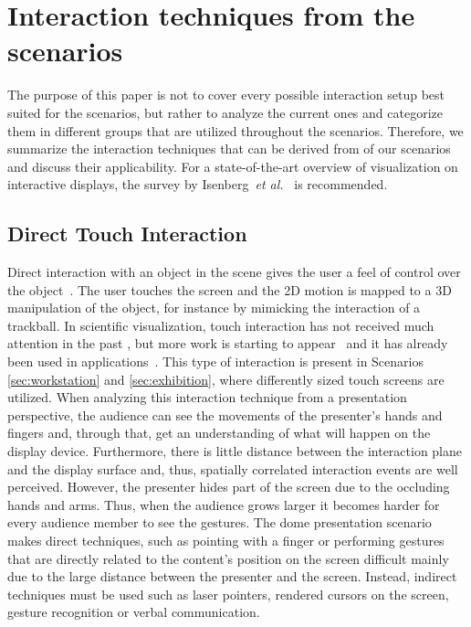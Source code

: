\documentclass[journal]{vgtc}                %
\begin{document}
\section{Interaction techniques from the scenarios} \label{sec:techniques}
The purpose of this paper is not to cover every possible interaction setup best suited for the scenarios, but rather to analyze the current ones and categorize them in different groups that are utilized throughout the scenarios.
Therefore, we summarize the interaction techniques that can be derived from of our scenarios and discuss their applicability. For a state-of-the-art overview of visualization on interactive displays, the survey by Isenberg~\textit{et al.}~\cite{isenberg:hal-00853925} is recommended.

\subsection{Direct Touch Interaction}
Direct interaction with an object in the scene gives the user a feel of control over the object~\cite{isenberg2009studying}. 
The user touches the screen and the 2D motion is mapped to a 3D manipulation of the object, for instance by mimicking the interaction of a trackball.
In scientific visualization, touch interaction has not received much attention in the past \cite{isenberg:hal-00781512}, but more work is starting to appear~\cite{Klein:2012:DSD:2322389.2322403} and it has already been used in applications~\cite{LRFPY11}.
This type of interaction is present in Scenarios \ref{sec:workstation} and \ref{sec:exhibition}, where differently sized touch screens are utilized. 
When analyzing this interaction technique from a presentation perspective, the audience can see the movements of the presenter's hands and fingers and, through that, get an understanding of what will happen on the display device.
Furthermore, there is little distance between the interaction plane and the display surface and, thus, spatially correlated interaction events are well perceived.
However, the presenter hides part of the screen due to the occluding hands and arms.
Thus, when the audience grows larger it becomes harder for every audience member to see the gestures.
The dome presentation scenario makes direct techniques, such as pointing with a finger or performing gestures that are directly related to the content's position on the screen difficult mainly due to the large distance between the presenter and the screen.
Instead, indirect techniques must be used such as laser pointers, rendered cursors on the screen, gesture recognition or verbal communication.
\end{document}
